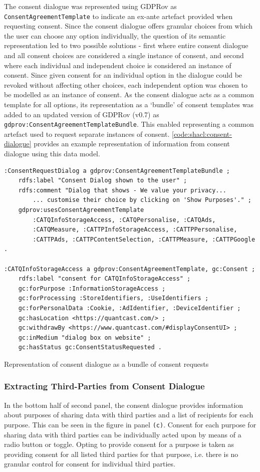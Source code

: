 The consent dialogue was represented using GDPRov as \texttt{ConsentAgreementTemplate} to indicate an ex-ante artefact provided when requesting consent.
Since the consent dialogue offers granular choices from which the user can choose any option individually, the question of its semantic representation led to two possible solutions - first where entire consent dialogue and all consent choices are considered a single instance of consent, and second where each individual and independent choice is considered an instance of consent.
Since given consent for an individual option in the dialogue could be revoked without affecting other choices, each independent option was chosen to be modelled as an instance of consent.
As the consent dialogue acts as a common template for all options, its representation as a `bundle' of consent templates was added to an updated version of GDPRov (v0.7) as \texttt{gdprov:ConsentAgreementTemplateBundle}. This enabled representing a common artefact used to request separate instances of consent.
\autoref{code:shacl:consent-dialogue} provides an example representation of information from consent dialogue using this data model.
\begin{listing}[htbp]
\begin{verbatim}
:ConsentRequestDialog a gdprov:ConsentAgreementTemplateBundle ;
    rdfs:label "Consent Dialog shown to the user" ;
    rdfs:comment "Dialog that shows - We value your privacy...
        ... customise their choice by clicking on 'Show Purposes'." ;
    gdprov:usesConsentAgreementTemplate 
        :CATQInfoStorageAccess, :CATQPersonalise, :CATQAds, 
        :CATQMeasure, :CATTPInfoStorageAccess, :CATTPPersonalise, 
        :CATTPAds, :CATTPContentSelection, :CATTPMeasure, :CATTPGoogle .

:CATQInfoStorageAccess a gdprov:ConsentAgreementTemplate, gc:Consent ;
    rdfs:label "consent for CATQInfoStorageAccess" ;
    gc:forPurpose :InformationStorageAccess ;
    gc:forProcessing :StoreIdentifiers, :UseIdentifiers ;
    gc:forPersonalData :Cookie, :AdIdentifier, :DeviceIdentifier ;
    gc:hasLocation <https://quantcast.com/> ;
    gc:withdrawBy <https://www.quantcast.com/#displayConsentUI> ;
    gc:inMedium "dialog box on website" ;
    gc:hasStatus gc:ConsentStatusRequested .
\end{verbatim}
\caption{Representation of consent dialogue as a bundle of consent requests}
\label{code:shacl:consent-dialogue}
\end{listing}

\subsubsection{Extracting Third-Parties from Consent Dialogue}
In the bottom half of second panel, the consent dialogue provides information about purposes of sharing data with third parties and a list of recipients for each purpose. This can be seen in the figure in panel \texttt{(c)}.
Consent for each purpose for sharing data with third parties can be individually acted upon by means of a radio button or toggle. Opting to provide consent for a purpose is taken as providing consent for all listed third parties for that purpose, i.e. there is no granular control for consent for individual third parties. 

